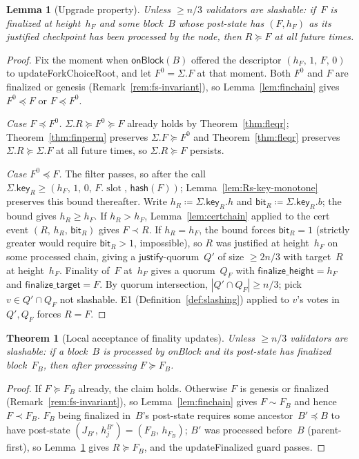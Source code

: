 \ifx\litemode\undefined\documentclass{article}\fi
\newcommand{\slot}[0]{\ensuremath{\operatorname{\mathrm{slot}}}}
\newcommand{\just}{\ensuremath{\mathsf{justify}}\xspace}
\newcommand{\finalizeHeight}{\mathsf{finalize\_height}}
\newcommand{\finalizeTarget}{\mathsf{finalize\_target}}
\newcommand{\hash}{\mathsf{hash}}
\newcommand{\key}{\mathsf{key}}
\newcommand{\bit}{\mathsf{bit}}
\newcommand{\onBlock}{\textsf{onBlock}\xspace}
\newcommand{\updateForkChoiceRoot}{\textsf{updateForkChoiceRoot}\xspace}
\newcommand{\updateFinalized}{\textsf{updateFinalized}\xspace}
\theoremstyle{plain}
\newtheorem{theorem}{Theorem}
\newtheorem{lemma}{Lemma}
\theoremstyle{definition}
\theoremstyle{remark}
\begin{document}
\begin{lemma}[Upgrade property]\label{lem:upgrade}
Unless $\geq n/3$ validators are slashable: if~$F$ is finalized at height~$h_F$ and some block~$B$ whose post-state has $(F, h_F)$ as its justified checkpoint has been processed by the node, then $R \succeq F$ at all future times.
\end{lemma}

\begin{proof}
Fix the moment when $\onBlock(B)$ offered the descriptor $(h_F,\, 1,\, F,\, 0)$ to \updateForkChoiceRoot, and let $F^0 = \Sigma.F$ at that moment.
Both $F^0$ and $F$ are finalized or genesis (Remark~\ref{rem:fs-invariant}), so Lemma~\ref{lem:finchain} gives $F^0 \preceq F$ or $F \preceq F^0$.

\emph{Case $F \preceq F^0$.}
$\Sigma.R \succeq F^0 \succeq F$ already holds by Theorem~\ref{thm:fleqr}; Theorem~\ref{thm:finperm} preserves $\Sigma.F \succeq F^0$ and Theorem~\ref{thm:fleqr} preserves $\Sigma.R \succeq \Sigma.F$ at all future times, so $\Sigma.R \succeq F$ persists.

\emph{Case $F^0 \preceq F$.}
The filter passes, so after the call $\Sigma.\key_R \geq (h_F,\, 1,\, 0,\, F.\slot,\, \hash(F))$; Lemma~\ref{lem:Rs-key-monotone} preserves this bound thereafter.
Write $h_R \coloneqq \Sigma.\key_R.h$ and $\bit_R \coloneqq \Sigma.\key_R.b$; the bound gives $h_R \geq h_F$.
If $h_R > h_F$, Lemma~\ref{lem:certchain} applied to the cert event $(R,\, h_R,\, \bit_R)$ gives $F \prec R$.
If $h_R = h_F$, the bound forces $\bit_R = 1$ (strictly greater would require $\bit_R > 1$, impossible), so $R$ was justified at height~$h_F$ on some processed chain, giving a \just-quorum~$Q'$ of size $\geq 2n/3$ with target~$R$ at height~$h_F$.
Finality of~$F$ at~$h_F$ gives a quorum~$Q_F$ with $\finalizeHeight = h_F$ and $\finalizeTarget = F$.
By quorum intersection, $|Q' \cap Q_F| \geq n/3$; pick $v \in Q' \cap Q_F$ not slashable.
E1 (Definition~\ref{def:slashing}) applied to $v$'s votes in~$Q', Q_F$ forces $R = F$.
\end{proof}

\begin{theorem}[Local acceptance of finality updates]\label{thm:finlive}
Unless $\geq n/3$ validators are slashable: if a block~$B$ is processed by \onBlock and its post-state has finalized block~$F_B$, then after processing $F \succeq F_B$.
\end{theorem}

\begin{proof}
If $F \succeq F_B$ already, the claim holds.
Otherwise $F$ is genesis or finalized (Remark~\ref{rem:fs-invariant}), so Lemma~\ref{lem:finchain} gives $F \sim F_B$ and hence $F \prec F_B$.
$F_B$ being finalized in~$B$'s post-state requires some ancestor~$B' \preceq B$ to have post-state $(J_{B'},\, h_j^{B'}) = (F_B,\, h_{F_B})$; $B'$ was processed before~$B$ (parent-first), so Lemma~\ref{lem:upgrade} gives $R \succeq F_B$, and the \updateFinalized guard passes.
\end{proof}
\end{document}
